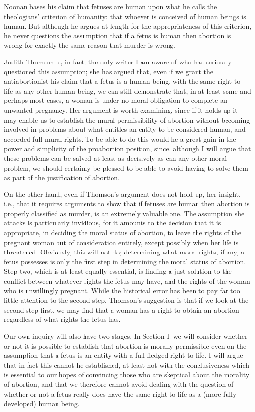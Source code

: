 Noonan bases his claim that fetuses are human upon what
he calls the theologians’ criterion of humanity: that
whoever is conceived of human beings is human. But
although he argues at length for the appropriateness of
this criterion, he never questions the assumption that if a
fetus is human then abortion is wrong for exactly the
same reason that murder is wrong.

Judith Thomson is, in fact, the only writer I am aware of
who has seriously questioned this assumption; she has
argued that, even if we grant the antiabortionist his claim
that a fetus is a human being, with the same right to life as
any other human being, we can still demonstrate that, in at
least some and perhaps most cases, a woman is under no
moral obligation to complete an unwanted pregnancy.\autocite{Thomson1}
Her argument is worth examining, since if it holds up it
may enable us to establish the mural permissibility of
abortion without becoming involved in problems about
what entitles an entity to be considered human, and
accorded full mural rights. To be able to do this would he
a great gain in the power and simplicity of the proabortion
position, since, although I will argue that these problems
can be salved at least as decisively as can any other moral
problem, we should certainly be pleased to be able to
avoid having to solve them as part of the justification of
abortion. 

On the other hand, even if Thomson’s argument does not
hold up, her insight, i.e., that it requires arguments to show that if fetuses are human then abortion is properly
classified as murder, is an extremely valuable one. The
assumption she attacks is particularly invidious, for it
amounts to the decision that it is appropriate, in deciding
the moral status of abortion, to leave the rights of the
pregnant woman out of consideration entirely, except
possibly when her life is threatened. Obviously, this will
not do; determining what moral rights, if any, a fetus
possesses is only the first step in determining the moral
status of abortion. Step two, which is at least equally
essential, is finding a just solution to the conflict between
whatever rights the fetus may have, and the rights of the
woman who is unwillingly pregnant. While the historical
error has been to pay far too little attention to the second
step, Thomson’s suggestion is that if we look at the
second step first, we may find that a woman has a right to
obtain an abortion regardless of what rights the fetus has.

Our own inquiry will also have two stages. In Section I,
we will consider whether or not it is possible to establish
that abortion is morally permissible even on the
assumption that a fetus is an entity with a full-fledged
right to life. I will argue that in fact this cannot he
established, at least not with the conclusiveness which is
essential to our hopes of convincing those who are
skeptical about the morality of abortion, and that we
therefore cannot avoid dealing with the question of
whether or not a fetus really does have the same right to
life as a (more fully developed) human being.

